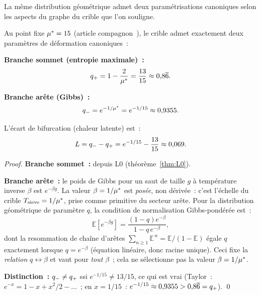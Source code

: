 \documentclass[12pt,a4paper]{article}
\begin{document}
La même distribution géométrique admet deux paramétrisations
canoniques selon les aspects du graphe du crible que l'on souligne.

\mTHM
\begin{theoreme}
\label{thm:bifurcation}
Au point fixe ${\mu^{*}} = 15$ (article compagnon~\cite{companion_M3}),
le crible admet exactement deux paramètres de déformation
canoniques~:

\textbf{Branche sommet (entropie maximale)~:}
\begin{equation}
  q_{+} = 1 - \frac{2}{{\mu^{*}}} = \frac{13}{15} \approx 0{,}8\overline{6}.
  \label{eq:qstat_val}
\end{equation}

\textbf{Branche arête (Gibbs)~:}
\begin{equation}
  q_{-} = e^{-1/{\mu^{*}}} = e^{-1/15} \approx 0{,}9355.
  \label{eq:qtherm_val}
\end{equation}

L'écart de bifurcation (chaleur latente) est~:
\begin{equation}
  L = q_{-} - q_{+} = e^{-1/15} - \frac{13}{15} \approx 0{,}069.
  \label{eq:latent_heat}
\end{equation}

\begin{proof}
\textbf{Branche sommet~:} depuis L0 (théorème~\ref{thm:L0}).

\textbf{Branche arête~:} le poids de Gibbs pour un saut de taille $g$
à température inverse $\beta$ est $e^{-\beta g}$. La valeur
$\beta = 1/{\mu^{*}}$ est \emph{posée}, non dérivée~: c'est l'échelle du
crible $T_{\rm sieve} = 1/{\mu^{*}}$, prise comme primitive du secteur
arête. Pour la distribution géométrique de paramètre $q$, la condition
de normalisation Gibbs-pondérée est~:
\[
  \mathbb{E}[e^{-\beta g}] = \frac{(1-q)e^{-\beta}}{1-q\,e^{-\beta}},
\]
dont la resommation de chaîne d'arêtes
$\sum_{n\geq 1}\mathbb{E}^{\,n} = \mathbb{E}/(1-\mathbb{E})$ égale $q$
exactement lorsque $q = e^{-\beta}$ (équation linéaire, donc racine
unique). Ceci fixe la \emph{relation} $q \leftrightarrow \beta$ et vaut
pour \emph{tout} $\beta$~; cela ne sélectionne pas la valeur
$\beta = 1/{\mu^{*}}$.

\textbf{Distinction~:} $q_{-} \neq q_{+}$ ssi $e^{-1/15} \neq 13/15$,
ce qui est vrai (Taylor~: $e^{-x} = 1 - x + x^2/2 - \ldots$~; en
$x = 1/15$~: $e^{-1/15} \approx 0{,}9355 > 0{,}8\overline{6} = q_{+}$).
\qed
\end{proof}
\end{theoreme}
\end{document}
